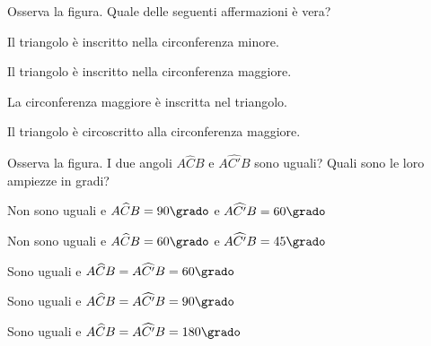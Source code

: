\noindent\begin{minipage}{0.7\textwidth}\parindent15pt
\begin{esercizio}
\label{ese:5.60}
Osserva la figura. Quale delle seguenti affermazioni è vera?
\begin{enumeratea}
\item Il triangolo è inscritto nella circonferenza minore.
\item Il triangolo è inscritto nella circonferenza maggiore.
\item La circonferenza maggiore è inscritta nel triangolo.
\item Il triangolo è circoscritto alla circonferenza maggiore.
\end{enumeratea}
\end{esercizio}
\end{minipage}\hfil
\begin{minipage}{0.3\textwidth}
	\centering
\end{minipage}\vspace{5pt}

\noindent\begin{minipage}{0.65\textwidth}\parindent15pt
\begin{esercizio}
\label{ese:5.61}
Osserva la figura. I due angoli $A\widehat{C}B$ e $A\widehat{C'}B$ 
sono uguali? Quali sono le loro ampiezze in gradi?
\begin{enumeratea}
\item Non sono uguali e $A\widehat{C}B=90\grado$ e 
$A\widehat{C'}B=60\grado$
\item Non sono uguali e $A\widehat{C}B=60\grado$ e 
$A\widehat{C'}B=45\grado$
\item Sono uguali e $A\widehat{C}B=A\widehat{C'}B=60\grado$
\item Sono uguali e $A\widehat{C}B=A\widehat{C'}B=90\grado$
\item Sono uguali e $A\widehat{C}B=A\widehat{C'}B=180\grado$
\end{enumeratea}
\end{esercizio}
\end{minipage}\hfil
\begin{minipage}{0.35\textwidth}
	\centering
\end{minipage}\vspace{5pt}

